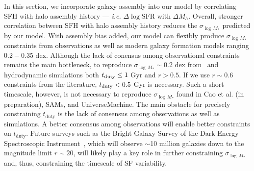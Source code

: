 \documentclass[12pt, letterpaper, preprint, tighten]{aastex62}
\newcommand{\logsfr}{\log\mathrm{SFR}}
\begin{document}
In this section, we incorporate galaxy assembly into our model by correlating 
SFH with halo assembly history --- \emph{i.e.} $\Delta\logsfr$ with $\Delta M_h$. 
Overall, stronger correlation between SFH with halo assembly history reduces
the $\sigma_{\log\,M_*}$ predicted by our model. With assembly bias added, our 
model can flexibly produce $\sigma_{\log\,M_*}$ constraints from observations 
as well as modern galaxy formation models ranging $0.2 - 0.35$ dex. Although 
the lack of conensus among observational constraints remains the main bottleneck, 
to reproduce $\sigma_{\log\,M_*}\sim 0.2$ dex from~\cite{more2011, leauthaud2012, reddick2013, tinker2013, zu2015} 
and hydrodynamic simulations both $t_{\rm duty} \leq 1$ Gyr and $r > 0.5$. If
we use $r\sim0.6$ constraints from the literature, $t_{\rm duty} < 0.5$ Gyr is 
necessary. Such a short timescale, however, is not necessary to reproduce 
$\sigma_{\log\,M_*}$ found in Cao et al. (in preparation), SAMs, and 
{\sc UniverseMachine}. The main obstacle for precisely constraining $t_\mathrm{duty}$
is the lack of consensus among observations as well as simulations. A better consensus 
among observations will enable better constraints on $t_\mathrm{duty}$. Future surveys 
such as the Bright Galaxy Survey of the Dark Energy Spectroscopic Instrument~\citep[DESI;][]{desicollaboration2016}, 
which will observe $\sim$10 million galaxies down to the magnitude limit 
$r \sim 20$, will likely play a key role in further constraining $\sigma_{\log\,M_*}$ 
and, thus, constraining the timescale of SF variability. 

\end{document}
